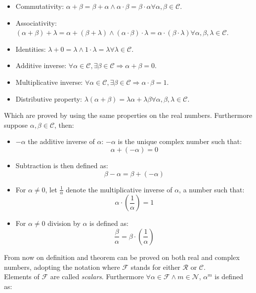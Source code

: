   \begin{multicols}{2}
    \begin{itemize}
      \item Commutativity: $\alpha+\beta = \beta+\alpha\land \alpha\cdot\beta=\beta\cdot\alpha\forall\alpha,\beta\in\mathcal{C}$.
      \item Associativity: $(\alpha+\beta) + \lambda = \alpha + (\beta+\lambda)\land (\alpha\cdot\beta)\cdot\lambda=\alpha\cdot(\beta\cdot\lambda)\forall\alpha,\beta,\lambda\in\mathcal{C}$.
      \item Identities: $\lambda + 0 = \lambda\land 1\cdot\lambda = \lambda\forall\lambda\in\mathcal{C}$.
      \item Additive inverse: $\forall\alpha\in\mathcal{C},\exists\beta\in\mathcal{C}\Rightarrow \alpha+\beta = 0$.
      \item Multiplicative inverse: $\forall\alpha\in\mathcal{C},\exists\beta\in\mathcal{C}\Rightarrow \alpha\cdot\beta = 1$.
      \item Distributive property: $\lambda(\alpha+\beta) = \lambda\alpha + \lambda\beta\forall\alpha,\beta,\lambda\in\mathcal{C}$.
    \end{itemize}
  \end{multicols}

  Which are proved by using the same properties on the real numbers.
  Furthermore suppose $\alpha,\beta\in\mathcal{C}$, then:

  \begin{multicols}{2}
    \begin{itemize}
      \item $-\alpha$ the additive inverse of $\alpha$: $-\alpha$ is the unique complex number such that:
        $$\alpha+(-\alpha) = 0$$
      \item Subtraction is then defined as:
        $$\beta - \alpha = \beta + (-\alpha)$$
      \item For $\alpha\neq 0$, let $\frac{1}{\alpha}$ denote the multiplicative inverse of $\alpha$, a number such that:
        $$\alpha\cdot\left(\frac{1}{\alpha}\right) = 1$$
      \item For $\alpha\neq 0$ division by $\alpha$ is defined as:
        $$\frac{\beta}{\alpha} = \beta\cdot\left(\frac{1}{\alpha}\right)$$
    \end{itemize}
  \end{multicols}

  From now on definition and theorem can be proved on both real and complex numbers, adopting the notation where $\mathcal{F}$ stands for either $\mathcal{R}$ or $\mathcal{C}$.\\
  Elements of $\mathcal{F}$ are called \emph{scalars}.
  Furthermore $\forall\alpha\in\mathcal{F}\land m\in\mathcal{N}$, $\alpha^m$ is defined as:

